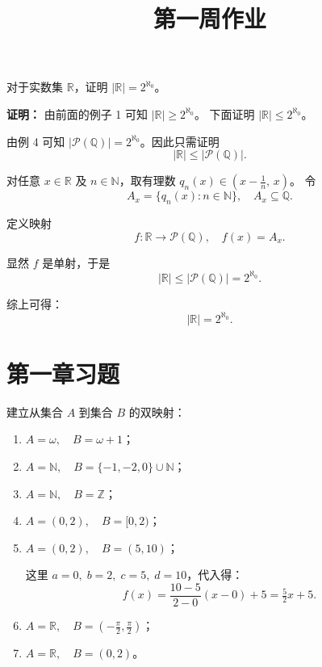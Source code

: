 \begin{example}
对于实数集 $\mathbb{R}$，证明 $|\mathbb{R}| = 2^{\aleph_0}$。

\textbf{证明：}  
由前面的例子 1 可知 $|\mathbb{R}| \geq 2^{\aleph_0}$。  
下面证明 $|\mathbb{R}| \leq 2^{\aleph_0}$。  

由例 4 可知 $|\mathcal{P}(\mathbb{Q})| = 2^{\aleph_0}$。因此只需证明
\[
|\mathbb{R}| \leq |\mathcal{P}(\mathbb{Q})|.
\]

对任意 $x \in \mathbb{R}$ 及 $n \in \mathbb{N}$，取有理数 $q_n(x) \in (x - \tfrac{1}{n}, \, x)$。  
令
\[
A_x = \{q_n(x) : n \in \mathbb{N}\}, \quad A_x \subseteq \mathbb{Q}.
\]

定义映射
\[
f : \mathbb{R} \to \mathcal{P}(\mathbb{Q}), \quad f(x) = A_x.
\]

显然 $f$ 是单射，于是
\[
|\mathbb{R}| \leq |\mathcal{P}(\mathbb{Q})| = 2^{\aleph_0}.
\]

综上可得：
\[
|\mathbb{R}| = 2^{\aleph_0}.
\]
\end{example}
\section{第一章习题}

\title{第一周作业}
\begin{homework}[1.1]
建立从集合 $A$ 到集合 $B$ 的双映射：
\begin{enumerate}
  \item $A = \omega, \quad B = \omega + 1$；
  \item $A = \mathbb{N}, \quad B = \{-1,-2,0\} \cup \mathbb{N}$；
  \item $A = \mathbb{N}, \quad B = \mathbb{Z}$；
  \item $A = (0,2), \quad B = [0,2)$；
  \item $A = (0,2), \quad B = (5,10)$；
  
  \begin{dxtips}[当函数做一个定义域一个值域]
      这里 $a=0, \; b=2, \; c=5, \; d=10$，代入得：
\[
f(x) = \frac{10-5}{2-0}(x-0) + 5 = \tfrac{5}{2}x + 5.
\]
  \end{dxtips}
  \item $A = \mathbb{R}, \quad B = \left(-\tfrac{\pi}{2}, \tfrac{\pi}{2}\right)$；
  \item $A = \mathbb{R}, \quad B = (0,2)$。
\end{enumerate}
\end{homework}

